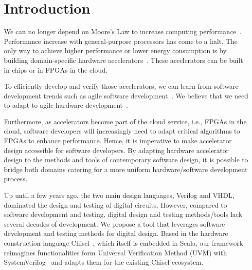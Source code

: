 \documentclass[conference]{IEEEtran}
\begin{document}
%
%


\section{Introduction}
\label{sec:introduction}

We can no longer depend on Moore's Law to increase computing performance~\cite{dark-silicon:2011}.
Performance increase with general-purpose processors has come to a halt.
The only way to achieve higher performance or lower energy consumption
is by building domain-specific hardware accelerators~\cite{domain-hw-acc:2020}.
These accelerators can be built in chips or in FPGAs in the cloud.

To efficiently develop and verify those accelerators, we can learn from software development trends such as agile software development~\cite{agile:manifesto}.
We believe that we need to adapt to agile hardware development~\cite{henn-patt:turing:2019}.

Furthermore, as accelerators become part of the cloud service, i.e., FPGAs in the cloud,
software developers will increasingly need to adapt critical algorithms to FPGAs to enhance performance.
Hence, it is imperative to make accelerator design accessible for software developers.
By adapting hardware accelerator design to the methods and tools of contemporary software design,
it is possible to bridge both domains catering for a more uniform hardware/software development process.

Up until a few years ago, the two main design languages, Verilog and VHDL, dominated the
design and testing of digital circuits.
However, compared to software development and testing, digital design and testing methods/tools 
lack several decades of development. We propose a tool that
leverages software development and testing methods for digital design.
Based in the hardware construction language Chisel~\cite{chisel:dac2012}, which itself is embedded in Scala,
our framework reimagines functionalities form Universal Verification Method (UVM) with SystemVerilog~\cite{SystemVerilog} and
adapts them for the existing Chisel ecosystem.
\end{document}
